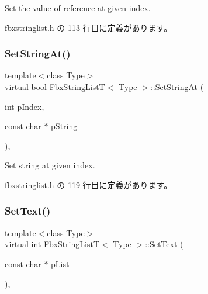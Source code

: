 Set the value of reference at given index. 



 fbxstringlist.\+h の 113 行目に定義があります。

\mbox{\label{class_fbx_string_list_t_a4b757a856d12717cfcf854e767af54f1}} 
\subsubsection{\texorpdfstring{Set\+String\+At()}{SetStringAt()}}
{\footnotesize\ttfamily template$<$class Type$>$ \\
virtual bool \hyperlink{class_fbx_string_list_t}{Fbx\+String\+ListT}$<$ Type $>$\+::Set\+String\+At (\begin{DoxyParamCaption}\item[{int}]{p\+Index,  }\item[{const char $\ast$}]{p\+String }\end{DoxyParamCaption})\hspace{0.3cm}{\ttfamily [inline]}, {\ttfamily [virtual]}}



Set string at given index. 



 fbxstringlist.\+h の 119 行目に定義があります。

\mbox{\label{class_fbx_string_list_t_a02f67be1bc4175ece4f9aa62efc17441}} 
\subsubsection{\texorpdfstring{Set\+Text()}{SetText()}}
{\footnotesize\ttfamily template$<$class Type$>$ \\
virtual int \hyperlink{class_fbx_string_list_t}{Fbx\+String\+ListT}$<$ Type $>$\+::Set\+Text (\begin{DoxyParamCaption}\item[{const char $\ast$}]{p\+List }\end{DoxyParamCaption})\hspace{0.3cm}{\ttfamily [inline]}, {\ttfamily [virtual]}}

